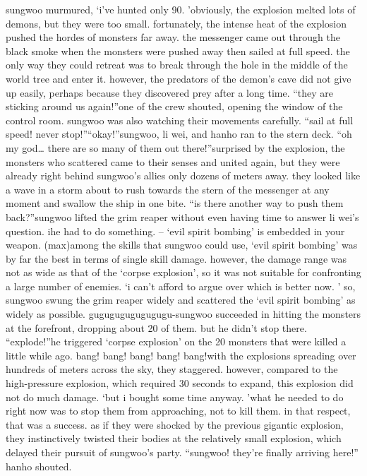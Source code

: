 sungwoo murmured, ‘i’ve hunted only 90.
’obviously, the explosion melted lots of demons, but they were too small.
fortunately, the intense heat of the explosion pushed the hordes of monsters far away.
the messenger came out through the black smoke when the monsters were pushed away then sailed at full speed.
 the only way they could retreat was to break through the hole in the middle of the world tree and enter it.
 however, the predators of the demon’s cave did not give up easily, perhaps because they discovered prey after a long time.
“they are sticking around us again!”one of the crew shouted, opening the window of the control room.
sungwoo was also watching their movements carefully.
“sail at full speed! never stop!”“okay!”sungwoo, li wei, and hanho ran to the stern deck.
“oh my god… there are so many of them out there!”surprised by the explosion, the monsters who scattered came to their senses and united again, but they were already right behind sungwoo’s allies only dozens of meters away.
they looked like a wave in a storm about to rush towards the stern of the messenger at any moment and swallow the ship in one bite.
“is there another way to push them back?”sungwoo lifted the grim reaper without even having time to answer li wei’s question.
 ihe had to do something.
– ‘evil spirit bombing’ is embedded in your weapon.
 (max)among the skills that sungwoo could use, ‘evil spirit bombing’ was by far the best in terms of single skill damage.
however, the damage range was not as wide as that of the ‘corpse explosion’, so it was not suitable for confronting a large number of enemies.
‘i can’t afford to argue over which is better now.
’
so, sungwoo swung the grim reaper widely and scattered the ‘evil spirit bombing’ as widely as possible.
gugugugugugugugu-sungwoo succeeded in hitting the monsters at the forefront, dropping about 20 of them.
but he didn’t stop there.
“explode!”he triggered ‘corpse explosion’ on the 20 monsters that were killed a little while ago.
bang! bang! bang! bang! bang!with the explosions spreading over hundreds of meters across the sky, they staggered.
however, compared to the high-pressure explosion, which required 30 seconds to expand, this explosion did not do much damage.
‘but i bought some time anyway.
’what he needed to do right now was to stop them from approaching, not to kill them.
in that respect, that was a success.
 as if they were shocked by the previous gigantic explosion, they instinctively twisted their bodies at the relatively small explosion, which delayed their pursuit of sungwoo’s party.
“sungwoo! they’re finally arriving here!” hanho shouted.
